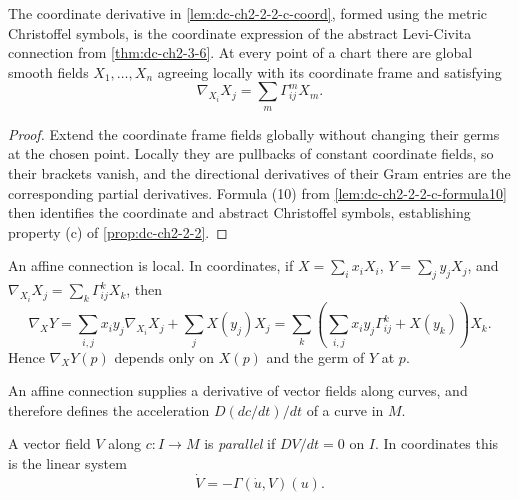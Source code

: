 \begin{lemma}
  \label{lem:dc-ch2-2-2-c-bridge}
  \leanok
  The coordinate derivative in \cref{lem:dc-ch2-2-2-c-coord}, formed using the
  metric Christoffel symbols, is the coordinate expression of the abstract
  Levi-Civita connection from \cref{thm:dc-ch2-3-6}. At every point of a chart
  there are global smooth fields $X_1,\dots,X_n$ agreeing locally with its
  coordinate frame and satisfying
  \[
    \nabla_{X_i}X_j=\sum_m\Gamma^m_{ij}X_m.
  \]
  \begin{proof}
    \leanok
    \sketch
    Extend the coordinate frame fields globally without changing their germs at
    the chosen point. Locally they are pullbacks of constant coordinate fields,
    so their brackets vanish, and the directional derivatives of their Gram
    entries are the corresponding partial derivatives. Formula (10) from
    \cref{lem:dc-ch2-2-2-c-formula10} then identifies the coordinate and abstract
    Christoffel symbols, establishing property (c) of
    \cref{prop:dc-ch2-2-2}.
  \end{proof}
\end{lemma}

\begin{remark}[Remark 2.3]
  \label{rem:dc-ch2-2-3}
  An affine connection is local. In coordinates, if
  $X=\sum_ix_iX_i$, $Y=\sum_jy_jX_j$, and
  $\nabla_{X_i}X_j=\sum_k\Gamma_{ij}^kX_k$, then
  \[
    \nabla_XY
      =\sum_{i,j}x_iy_j\nabla_{X_i}X_j+\sum_jX(y_j)X_j
      =\sum_k\left(\sum_{i,j}x_iy_j\Gamma_{ij}^k+X(y_k)\right)X_k.
  \]
  Hence $\nabla_XY(p)$ depends only on $X(p)$ and the germ of $Y$ at $p$.
\end{remark}

\begin{remark}[Remark 2.4]
  \label{rem:dc-ch2-2-4}
  An affine connection supplies a derivative of vector fields along curves, and
  therefore defines the acceleration $D(dc/dt)/dt$ of a curve in $M$.
\end{remark}

\begin{definition}
  \label{def:dc-ch2-2-5}
  \leanok
  A vector field $V$ along $c\colon I\to M$ is \emph{parallel} if
  $DV/dt=0$ on $I$. In coordinates this is the linear system
  \[
    \dot V=-\Gamma(\dot u,V)(u).
  \]
\end{definition}

